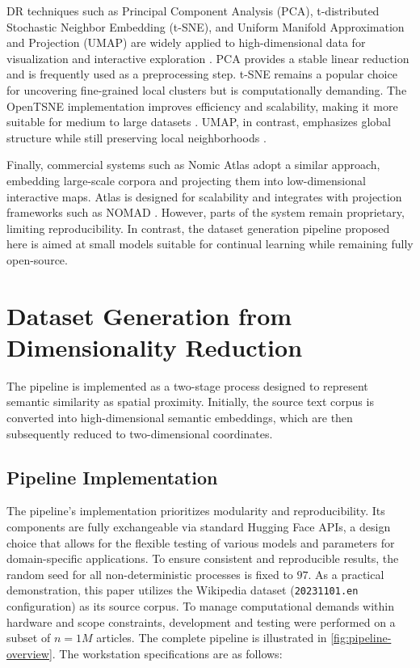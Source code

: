 DR techniques such as Principal Component Analysis (PCA), t-distributed Stochastic Neighbor Embedding (t-SNE), and Uniform Manifold Approximation and Projection (UMAP) are widely applied to high-dimensional data for visualization and interactive exploration \cite{smilkovEmbeddingProjectorInteractive2016}. PCA provides a stable linear reduction and is frequently used as a preprocessing step. t-SNE remains a popular choice for uncovering fine-grained local clusters but is computationally demanding. The OpenTSNE implementation improves efficiency and scalability, making it more suitable for medium to large datasets \cite{policarOpenTSNEModularPython2024}. UMAP, in contrast, emphasizes global structure while still preserving local neighborhoods \cite{mcinnesUMAPUniformManifold2020a}.

Finally, commercial systems such as Nomic Atlas \cite{duderstadtAtlasWhitepaperScalable} adopt a similar approach, embedding large-scale corpora and projecting them into low-dimensional interactive maps. Atlas is designed for scalability and integrates with projection frameworks such as NOMAD \cite{nussbaumNomicEmbedTraining2025}. However, parts of the system remain proprietary, limiting reproducibility. In contrast, the dataset generation pipeline proposed here is aimed at small models suitable for continual learning while remaining fully open-source.

\section{Dataset Generation from Dimensionality Reduction}
\label{sec:main}

The pipeline is implemented as a two-stage process designed to represent semantic similarity as spatial proximity. Initially, the source text corpus is converted into high-dimensional semantic embeddings, which are then subsequently reduced to two-dimensional coordinates.

\subsection{Pipeline Implementation}
\label{subsec:pipeline}

The pipeline's implementation prioritizes modularity and reproducibility. Its components are fully exchangeable via standard Hugging Face APIs, a design choice that allows for the flexible testing of various models and parameters for domain-specific applications. To ensure consistent and reproducible results, the random seed for all non-deterministic processes is fixed to $97$. As a practical demonstration, this paper utilizes the Wikipedia dataset \cite{WikimediaWikipediaDatasets2025} (\texttt{20231101.en} configuration) as its source corpus. To manage computational demands within hardware and scope constraints, development and testing were performed on a subset of $n=1M$ articles. The complete pipeline is illustrated in \autoref{fig:pipeline-overview}. The workstation specifications are as follows:

